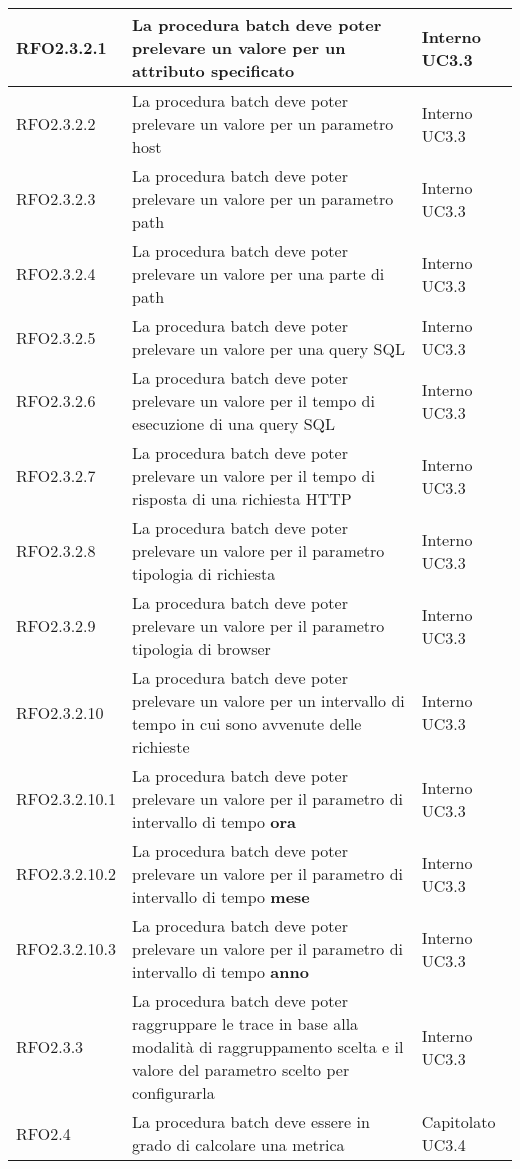 \begin{center}
\begin{longtable}{ | >{\centering\arraybackslash}m{2.5cm} | >{\centering\arraybackslash}m{8cm} | >{\centering\arraybackslash}m{2.5cm} | }
        RFO2.3.2.1 & La procedura batch deve poter prelevare un valore per un attributo specificato & Interno UC3.3\\ \hline
        RFO2.3.2.2 & La procedura batch deve poter prelevare un valore per un parametro host & Interno UC3.3\\ \hline
        RFO2.3.2.3 & La procedura batch deve poter prelevare un valore per un parametro path & Interno UC3.3\\ \hline
        RFO2.3.2.4 & La procedura batch deve poter prelevare un valore per una parte di path & Interno UC3.3\\ \hline
        RFO2.3.2.5 & La procedura batch deve poter prelevare un valore per una query SQL & Interno UC3.3\\ \hline
        RFO2.3.2.6 & La procedura batch deve poter prelevare un valore per il tempo di esecuzione di una query SQL & Interno UC3.3\\ \hline
        RFO2.3.2.7 & La procedura batch deve poter prelevare un valore per il tempo di risposta di una richiesta HTTP & Interno UC3.3\\ \hline
        RFO2.3.2.8 & La procedura batch deve poter prelevare un valore per il parametro tipologia di richiesta & Interno UC3.3\\ \hline
        RFO2.3.2.9 & La procedura batch deve poter prelevare un valore per il parametro tipologia di browser & Interno UC3.3\\ \hline
        RFO2.3.2.10 & La procedura batch deve poter prelevare un valore per un intervallo di tempo in cui sono avvenute delle richieste & Interno UC3.3\\ \hline
        RFO2.3.2.10.1 & La procedura batch deve poter prelevare un valore per il parametro di intervallo di tempo \textbf{ora} & Interno UC3.3\\ \hline
        RFO2.3.2.10.2 & La procedura batch deve poter prelevare un valore per il parametro di intervallo di tempo \textbf{mese} & Interno UC3.3\\ \hline
        RFO2.3.2.10.3 & La procedura batch deve poter prelevare un valore per il parametro di intervallo di tempo \textbf{anno} & Interno UC3.3\\ \hline
        RFO2.3.3 & La procedura batch deve poter raggruppare le trace in base alla modalità di raggruppamento scelta e il valore del parametro scelto per configurarla & Interno UC3.3\\ \hline
       	RFO2.4 & La procedura batch deve essere in grado di calcolare una metrica & Capitolato 	UC3.4\\ \hline

\end{longtable}
\end{center}
